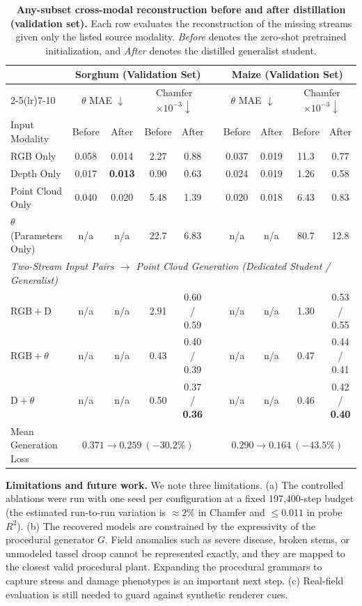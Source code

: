 \documentclass[10pt,twocolumn,letterpaper]{article}
\begin{document}
\begin{table}[t]
  \caption{\textbf{Any-subset cross-modal reconstruction before and after distillation (validation set).} Each row evaluates the reconstruction of the missing streams given only the listed source modality. \emph{Before} denotes the zero-shot pretrained initialization, and \emph{After} denotes the distilled generalist student.}
  \label{tab:anysubset}\label{tab:main}
  \centering\scriptsize
  \setlength{\tabcolsep}{3.6pt}
  \begin{tabular}{l cc cc c cc cc}
    \toprule
    & \multicolumn{4}{c}{Sorghum (Validation Set)} & & \multicolumn{4}{c}{Maize (Validation Set)} \\
    \cmidrule(lr){2-5}\cmidrule(lr){7-10}
    & \multicolumn{2}{c}{$\theta$ MAE $\downarrow$} & \multicolumn{2}{c}{Chamfer $\times10^{-3}\downarrow$} & & \multicolumn{2}{c}{$\theta$ MAE $\downarrow$} & \multicolumn{2}{c}{Chamfer $\times10^{-3}\downarrow$} \\
    Input Modality & Before & After & Before & After & & Before & After & Before & After \\
    \midrule
    RGB Only & 0.058 & 0.014 & 2.27 & 0.88 & & 0.037 & 0.019 & 11.3 & 0.77 \\
    Depth Only & 0.017 & \textbf{0.013} & 0.90 & 0.63 & & 0.024 & 0.019 & 1.26 & 0.58 \\
    Point Cloud Only & 0.040 & 0.020 & 5.48 & 1.39 & & 0.020 & 0.018 & 6.43 & 0.83 \\
    $\theta$ (Parameters Only) & n/a& n/a& 22.7 & 6.83 & & n/a& n/a& 80.7 & 12.8 \\
    \midrule
    \multicolumn{10}{l}{\emph{Two-Stream Input Pairs $\to$ Point Cloud Generation (Dedicated Student / Generalist)}} \\
    $\mathrm{RGB}+\mathrm{D}$ & n/a& n/a& 2.91 & 0.60 / 0.59 & & n/a& n/a& 1.30 & 0.53 / 0.55 \\
    $\mathrm{RGB}+\theta$ & n/a& n/a& 0.43 & 0.40 / 0.39 & & n/a& n/a& 0.47 & 0.44 / 0.41 \\
    $\mathrm{D}+\theta$ & n/a& n/a& 0.50 & 0.37 / \textbf{0.36} & & n/a& n/a& 0.46 & 0.42 / \textbf{0.40} \\
    \midrule
    Mean Generation Loss & \multicolumn{4}{c}{$0.371 \to 0.259\ (-30.2\%)$} & & \multicolumn{4}{c}{$0.290 \to 0.164\ (-43.5\%)$} \\
    \bottomrule
  \end{tabular}
\end{table}

\noindent\textbf{Limitations and future work.}
We note three limitations. (a) The controlled ablations were run with one seed per configuration at a fixed 197{,}400-step budget (the estimated run-to-run variation is $\approx 2\%$ in Chamfer and $\le 0.011$ in probe $R^2$). (b) The recovered models are constrained by the expressivity of the procedural generator $G$. Field anomalies such as severe disease, broken stems, or unmodeled tassel droop cannot be represented exactly, and they are mapped to the closest valid procedural plant. Expanding the procedural grammars to capture stress and damage phenotypes is an important next step. (c) Real-field evaluation is still needed to guard against synthetic renderer cues.
\end{document}
